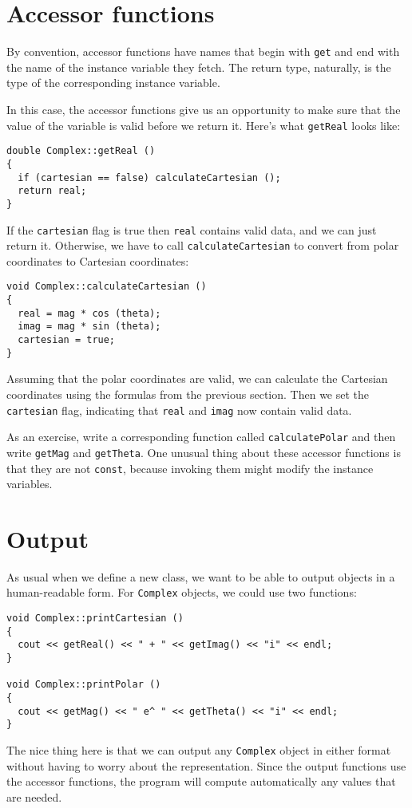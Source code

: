 \section{Accessor functions}

By convention, accessor functions have names that
begin with {\tt get} and end with the name of the instance
variable they fetch.  The return type, naturally, is the type
of the corresponding instance variable.


In this case, the accessor functions give us an opportunity
to make sure that the value of the variable is valid before
we return it.  Here's what {\tt getReal} looks like:

\begin{lstlisting}
double Complex::getReal ()
{
  if (cartesian == false) calculateCartesian ();
  return real;
}
\end{lstlisting}
%
If the {\tt cartesian} flag is true then {\tt real} contains
valid data, and we can just return it.  Otherwise, we have
to call {\tt calculateCartesian} to convert from polar coordinates
to Cartesian coordinates:

\begin{lstlisting}
void Complex::calculateCartesian ()
{
  real = mag * cos (theta);
  imag = mag * sin (theta);
  cartesian = true;
}
\end{lstlisting}
%
Assuming that the polar coordinates are valid, we
can calculate the Cartesian coordinates using the formulas
from the previous section.  Then we
set the {\tt cartesian} flag, indicating that {\tt real}
and {\tt imag} now contain valid data.

As an exercise, write a corresponding function called
{\tt calculatePolar} and then write {\tt getMag}
and {\tt getTheta}.  One unusual thing about these
accessor functions is that they are not {\tt const},
because invoking them might modify the instance variables.

\section{Output}

As usual when we define a new class, we want to be able to
output objects in a human-readable form.  For {\tt Complex}
objects, we could use two functions:

\begin{lstlisting}
void Complex::printCartesian ()
{
  cout << getReal() << " + " << getImag() << "i" << endl;
}

void Complex::printPolar ()
{
  cout << getMag() << " e^ " << getTheta() << "i" << endl;
}
\end{lstlisting}
%
The nice thing here is that we can output any {\tt Complex} object in
either format without having to worry about the representation.  Since
the output functions use the accessor functions, the program
will compute automatically any values that are needed.

